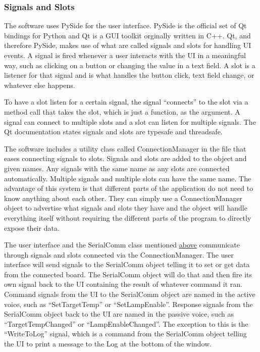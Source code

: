 \documentclass{article}
\begin{document}
\subsubsection{Signals and Slots} \label{sssec:SWSigSlots}
The software uses PySide for the user interface.  PySide is the official set of Qt bindings for
Python and Qt is a GUI toolkit orginally written in C++.  Qt, and therefore PySide, makes use of
what are called signals and slots for handling UI events.  A signal is fired whenever a user
interacts with the UI in a meaningful way, such as clicking on a button or changing the value in a
text field.  A slot is a listener for that signal and is what handles the button click, text field
change, or whatever else happens.

To have a slot listen for a certain signal, the signal ``connects'' to the slot via a method call
that takes the slot, which is just a function, as the argument.  A signal can connect to multiple
slots and a slot can listen for multiple signals.  The Qt documentation states signals and slots are
typesafe and threadsafe.

The software includes a utility class called ConnectionManager in the file 
that eases connecting signals to slots.  Signals and slots are added to the object and given names.
Any signals with the same name as any slots are connected automatically.  Multiple signals and
multiple slots can have the same name.  The advantage of this system is that different parts of the
application do not need to know anything about each other.  They can simply use a ConnectionManager
object to advertise what signals and slots they have and the object will handle everything itself
without requiring the different parts of the program to directly expose their data.

The user interface and the SerialComm class mentioned \hyperref[ssec:Architecture]{above}
communicate through signals and slots connected via the ConnectionManager.  The user interface will
send signals to the SerialComm object telling it to set or get data from the connected board.  The
SerialComm object will do that and then fire its own signal back to the UI containing the result of
whatever command it ran.  Command signals from the UI to the SerialComm object are named in the
active voice, such as ``SetTargetTemp'' or ``SetLampEnable''.  Response signals from the SerialComm
object back to the UI are named in the passive voice, such as ``TargetTempChanged'' or
``LampEnableChanged''.  The exception to this is the ``WriteToLog'' signal, which is a command from
the SerialComm object telling the UI to print a message to the Log at the bottom of the window.
\end{document}
